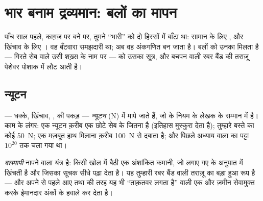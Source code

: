 \chapter{भार बनाम द्रव्यमान: बलों का मापन}\label{ch:g9:weight-vs-mass}

पाँच साल पहले, काग़ज़ पर बने  पर, तुमने ``भारी'' को दो हिस्सों
में बाँटा था: सामान के लिए , और खिंचाव के लिए । वह बँटवारा
समझदारी था; अब वह अंकगणित बन जाता है। बलों को उनका  मिलता है ---
गिरते सेब वाले उसी शख़्स के नाम पर ---  को उसका सूत्र, और बचपन वाली
रबर बैंड की तराज़ू पेशेवर पोशाक में लौट आती है।

\section{न्यूटन}

\begin{definition}[न्यूटन]\label{def:g9:weight-vs-mass:newton}
 --- धक्के, खिंचाव, ,  की पकड़ --- \emph{न्यूटन}%
 (\unit{N}) में मापे जाते हैं, जो  के नियम
के लेखक के सम्मान में है। काम के लंगर: एक न्यूटन क़रीब एक छोटे सेब के
 जितना है (इतिहास मुस्कुरा देता है); तुम्हारे बस्ते का  कोई
\qty{50}{N}; एक मज़बूत हाथ मिलाना क़रीब \qty{100}{N} से दबाता है; और
पिछले अध्याय वाला  का पट्टा $10^{20}$ तक चला गया था।
\end{definition}

\begin{definition}[बलमापी]\label{def:g9:weight-vs-mass:dynamometer}
\emph{बलमापी}  नापने वाला यंत्र है: किसी खोल में बैठी
एक अंशांकित कमानी, जो लगाए गए  के अनुपात में खिंचती है और जिसका
सूचक सीधे  पढ़ा देता है। यह तुम्हारी रबर बैंड वाली तराज़ू का बड़ा
हुआ रूप है --- और अपने से पहले आए  तथा  की तरह यह भी
``ताक़तवर लगता है'' वाली एक और ज़मीन सेवामुक्त करके ईमानदार अंकों के
हवाले कर देता है।
\end{definition}

